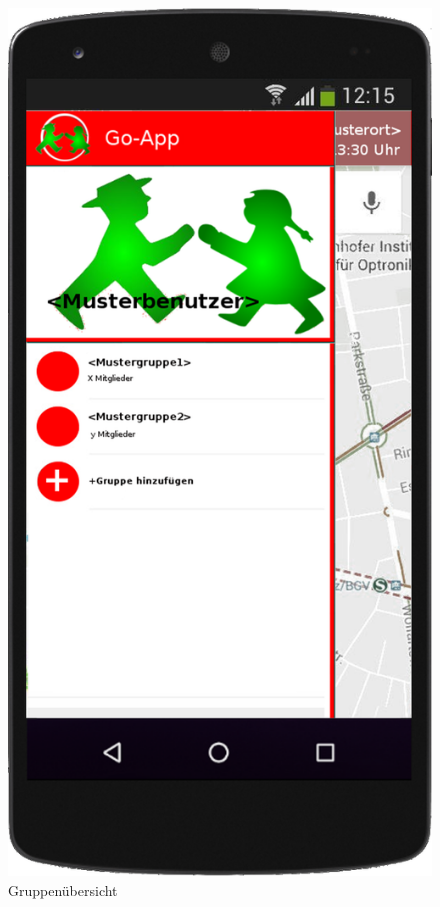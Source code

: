 \begin{figure}
	\includegraphics[scale=0.2]{resources/images/handy/gruppenuebersicht.png}
	\caption{Gruppenübersicht}
\end{figure}

